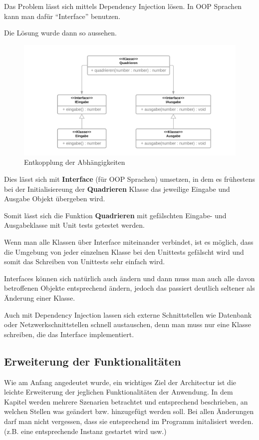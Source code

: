\documentclass{article}
\begin{document}
    Das Problem lässt sich mittels Dependency Injection lösen.
    In OOP Sprachen kann man dafür ``Interface'' benutzen.

    Die Lösung wurde dann so aussehen. 
    \begin{figure}[H]
        \centering
        \includegraphics[width=1\textwidth]{./images/DepInj_2.png}
        \caption{Entkopplung der Abhängigkeiten}
        \label{fig:flow around cylinder}
    \end{figure}

    Dies lässt sich mit \textbf{Interface} (für OOP Sprachen) umsetzen, 
    in dem es frühestens bei der Initialisiereung der \textbf{Quadrieren} 
    Klasse das jeweilige Eingabe und Ausgabe Objekt übergeben wird.

    Somit lässt sich die Funktion \textbf{Quadrieren} mit gefälschten Eingabe- und Ausgabeklasse mit Unit tests getestet werden.

    Wenn man alle Klassen über Interface miteinander verbindet, 
    ist es möglich, dass die Umgebung von jeder einzelnen Klasse bei den Unittests gefälscht
    wird und somit das Schreiben von Unittests sehr einfach wird. 

    Interfaces können sich natürlich auch ändern und dann muss man auch alle davon betroffenen Objekte entsprechend ändern, 
    jedoch das passiert deutlich seltener als Änderung einer Klasse.

    Auch mit Dependency Injection lassen sich externe Schnittstellen wie Datenbank oder Netzwerkschnittstellen schnell austauschen, 
    denn man muss nur eine Klasse schreiben, die das Interface implementiert.

    \newpage
    \subsection{Erweiterung der Funktionalitäten}
    Wie am Anfang angedeutet wurde, ein wichtiges Ziel der Architectur ist die leichte Erweiterung der jeglichen Funktionalitäten der 
    Anwendung. In dem Kapitel werden mehrere Szenarien betrachtet und entsprechend beschrieben, an welchen Stellen was geändert bzw.
    hinzugefügt werden soll. Bei allen Änderungen darf man nicht vergessen, dass sie entsprechend im Programm initalisiert werden.
    (z.B. eine entsprechende Instanz gestartet wird usw.)
    
\end{document}
